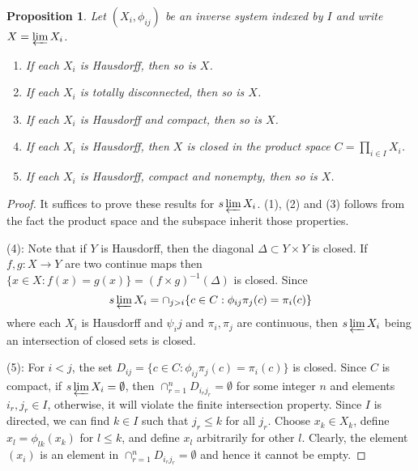 \documentclass[12pt]{report}
\newtheorem{proposition}[theorem]{Proposition}
{\theoremstyle{remark}\newtheorem*{remark}{Remark}}
\theoremstyle{definition}
\begin{document}
\begin{proposition}\label{27.6}
	Let $(X_i,\phi_{ij})$ be an inverse system indexed by $I$ and write $X=\varprojlim X_i$.
	\begin{enumerate}
		\item If each $X_i$ is Hausdorff, then so is $X$.
		\item If each $X_i$ is totally disconnected, then so is $X$.
		\item If each $X_i$ is Hausdorff and compact, then so is $X$.
		\item If each $X_i$ is Hausdorff, then $X$ is closed in the product space $C=\prod_{i\in I}X_i$.
		\item If each $X_i$ is Hausdorff, compact and nonempty, then so is $X$.
	\end{enumerate}
\end{proposition}
\begin{proof}
	It suffices to prove these results for $s\varprojlim X_i$. (1), (2) and (3) follows from the fact the product space and the subspace inherit those properties.

	(4): Note that if $Y$ is Hausdorff, then the diagonal $\Delta\subset Y\times Y$ is closed. If $f,g: X\to Y$ are two continue maps then $\{x\in X: f(x)=g(x)\} =(f\times g)^{-1}(\Delta)$ is closed. Since $$s\varprojlim X_i= \cap_{j> i} \{c\in C: \phi_{ij}\pi_j(c)=\pi_i(c)\}$$ where each $X_i$ is Hausdorff and $\psi_ij$ and $\pi_i,\pi_j$ are continuous, then $s\varprojlim X_i$ being an intersection of closed sets is closed.

	(5): For $i<j$, the set $D_{ij}=\{c\in C: \phi_{ij}\pi_j(c)=\pi_i(c)\}$ is closed. Since $C$ is compact, if $s\varprojlim X_i=\emptyset$, then $\cap_{r=1}^n D_{i_rj_r}=\emptyset$ for some integer $n$ and elements $i_r,j_r\in I$, otherwise, it will violate the finite intersection property. Since $I$ is directed, we can find $k\in I$ such that $j_r\leq k$ for all $j_r$. Choose $x_k\in X_k$, define $x_l=\phi_{lk}(x_k)$ for $l\leq k$, and define $x_l$ arbitrarily for other $l$. Clearly, the element $(x_i)$ is an element in $\cap_{r=1}^n D_{i_rj_r}=\emptyset$ and hence it cannot be empty.
\end{proof}
\end{document}
